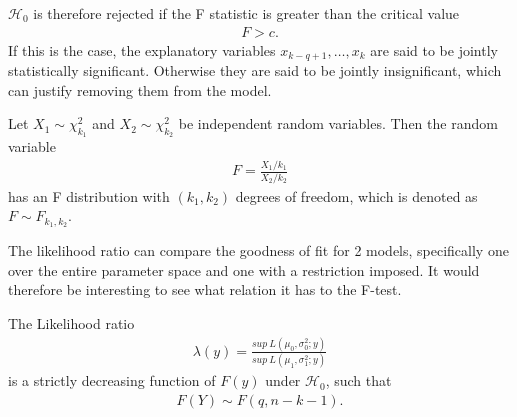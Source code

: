 $\mathcal{H}_0$ is therefore rejected if the F statistic is greater than the critical value
\begin{align*}
    F>c.
\end{align*}
If this is the case, the explanatory variables $x_{k-q+1}, \ldots, x_k$ are said to be jointly statistically significant. Otherwise they are said to be jointly insignificant, which can justify removing them from the model. 

\begin{definition}[F Distribution]
    Let $X_1 \sim \chi_{k_1}^2$ and $X_2 \sim \chi_{k_2}^2$ be independent random variables. Then the random variable 
        \begin{align*}
            F = \frac{X_1/k_1}{X_2/k_2}
        \end{align*}
    has an F distribution with $(k_1, k_2)$ degrees of freedom, which is denoted as $F \sim F_{k_1, k_2}$.
\end{definition}

The likelihood ratio can compare the goodness of fit for 2 models, specifically one over the entire parameter space and one with a restriction imposed.
It would therefore be interesting to see what relation it has to the F-test.

\begin{theorem}
\label{th:Likelihood_ratio_linear_models}
    The Likelihood ratio
    \begin{align*}
        \lambda(y) = \frac{sup \ L(\mu_0, \sigma_0^2; y)}{sup \ L(\mu_1, \sigma_1^2; y)}
    \end{align*}
    is a strictly decreasing function of $F(y)$ under $\mathcal{H}_0$, such that
    \begin{align*}
        F(Y) \sim F(q, n-k-1).
    \end{align*}
\end{theorem}

